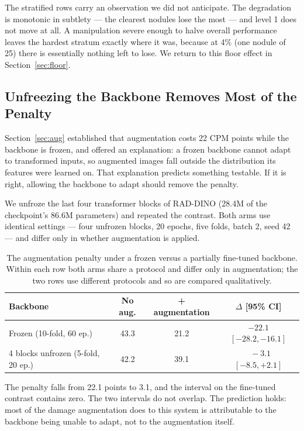 \documentclass[11pt,a4paper]{article}
\begin{document}
The stratified rows carry an observation we did not anticipate. The degradation
is monotonic in subtlety --- the clearest nodules lose the most --- and level 1
does not move at all. A manipulation severe enough to halve overall performance
leaves the hardest stratum exactly where it was, because at 4\% (one nodule of
25) there is essentially nothing left to lose. We return to this floor effect
in Section~\ref{sec:floor}.

\subsection{Unfreezing the Backbone Removes Most of the Penalty}
\label{sec:ft}

Section~\ref{sec:aug} established that augmentation costs 22 CPM points while the
backbone is frozen, and offered an explanation: a frozen backbone cannot adapt to
transformed inputs, so augmented images fall outside the distribution its
features were learned on. That explanation predicts something testable. If it is
right, allowing the backbone to adapt should remove the penalty.

We unfroze the last four transformer blocks of RAD-DINO (28.4M of the
checkpoint's 86.6M parameters) and repeated the contrast. Both arms use identical settings
--- four unfrozen blocks, 20 epochs, five folds, batch 2, seed 42 --- and differ
only in whether augmentation is applied.

\begin{table}[t]
\centering
\caption{The augmentation penalty under a frozen versus a partially fine-tuned
backbone. Within each row both arms share a protocol and differ only in
augmentation; the two rows use different protocols and so are compared
qualitatively.}
\label{tab:ft}
\begin{tabular}{lccc}
\toprule
Backbone & No aug. & + augmentation & $\Delta$ [95\% CI] \\
\midrule
Frozen (10-fold, 60 ep.)        & 43.3 & 21.2 & $-22.1$ $[-28.2, -16.1]$ \\
4 blocks unfrozen (5-fold, 20 ep.) & 42.2 & 39.1 & $\phantom{0}-3.1$ $[-8.5, +2.1]$ \\
\bottomrule
\end{tabular}
\end{table}

The penalty falls from 22.1 points to 3.1, and the interval on the fine-tuned
contrast contains zero. The two intervals do not overlap. The prediction holds:
most of the damage augmentation does to this system is attributable to the
backbone being unable to adapt, not to the augmentation itself.
\end{document}
